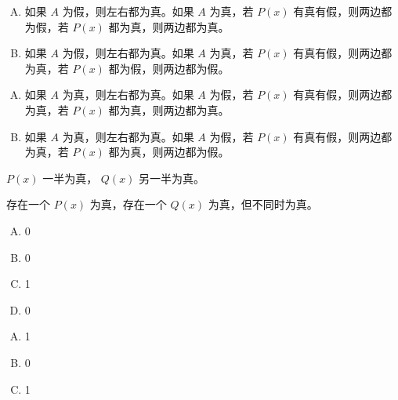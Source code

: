 {{        %
        \begin{practices}
            \begin{enumerate}[A.]
                \item 如果 $A$ 为假，则左右都为真。如果 $A$ 为真，若 $P(x)$ 有真有假，则两边都为假，若 $P(x)$ 都为真，则两边都为真。
                \item 如果 $A$ 为假，则左右都为真。如果 $A$ 为真，若 $P(x)$ 有真有假，则两边都为真，若 $P(x)$ 都为假，则两边都为假。
            \end{enumerate}
        \end{practices}

        \begin{practices}
            \begin{enumerate}[A.]
                \item 如果 $A$ 为真，则左右都为真。如果 $A$ 为假，若 $P(x)$ 有真有假，则两边都为真，若 $P(x)$ 都为真，则两边都为真。
                \item 如果 $A$ 为真，则左右都为真。如果 $A$ 为假，若 $P(x)$ 有真有假，则两边都为真，若 $P(x)$ 都为真，则两边都为假。
            \end{enumerate}
        \end{practices}

        \begin{practices}
            $P(x)$ 一半为真， $Q(x)$ 另一半为真。
        \end{practices}

        \begin{practices}
            存在一个 $P(x)$ 为真，存在一个 $Q(x)$ 为真，但不同时为真。
        \end{practices}

        \begin{practices}
            \begin{enumerate}[A.]
                \item 0
                \item 0
                \item 1
                \item 0
            \end{enumerate}
        \end{practices}

        \begin{practices}
            \begin{enumerate}[A.]
                \item 1
                \item 0
                \item 1
            \end{enumerate}
        \end{practices}

}}
